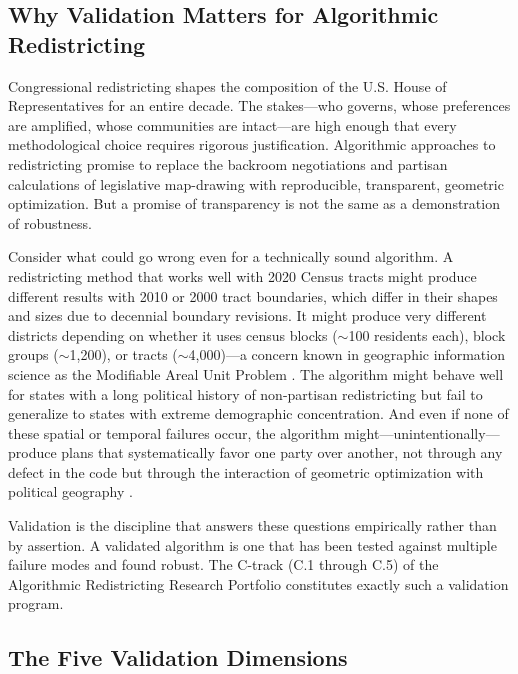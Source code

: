 
\subsection{Why Validation Matters for Algorithmic Redistricting}

Congressional redistricting shapes the composition of the U.S. House of
Representatives for an entire decade. The stakes---who governs, whose
preferences are amplified, whose communities are intact---are high enough
that every methodological choice requires rigorous justification.
Algorithmic approaches to redistricting promise to replace the backroom
negotiations and partisan calculations of legislative map-drawing with
reproducible, transparent, geometric optimization. But a promise of
transparency is not the same as a demonstration of robustness.

Consider what could go wrong even for a technically sound algorithm.
A redistricting method that works well with 2020 Census tracts might
produce different results with 2010 or 2000 tract boundaries, which
differ in their shapes and sizes due to decennial boundary revisions.
It might produce very different districts depending on whether it uses
census blocks ($\sim$100 residents each), block groups ($\sim$1,200),
or tracts ($\sim$4,000)---a concern known in geographic information
science as the Modifiable Areal Unit Problem
\citep{openshaw1984modifiable}. The algorithm might behave well for
states with a long political history of non-partisan redistricting but
fail to generalize to states with extreme demographic concentration.
And even if none of these spatial or temporal failures occur, the
algorithm might---unintentionally---produce plans that systematically
favor one party over another, not through any defect in the code but
through the interaction of geometric optimization with political
geography \citep{chen2013unintentional}.

Validation is the discipline that answers these questions empirically
rather than by assertion. A validated algorithm is one that has been
tested against multiple failure modes and found robust. The C-track
(C.1 through C.5) of the Algorithmic Redistricting Research Portfolio
constitutes exactly such a validation program.

\subsection{The Five Validation Dimensions}

